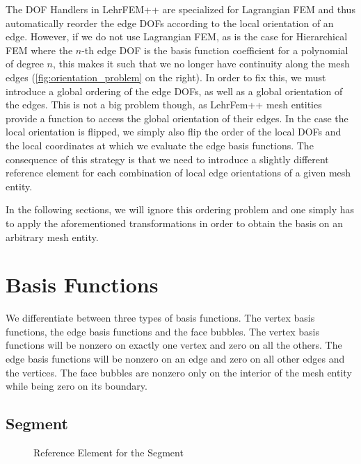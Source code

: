 \documentclass[10pt,a4paper]{article}
\begin{document}
    The DOF Handlers in LehrFEM++ are specialized for Lagrangian FEM and thus automatically reorder the edge DOFs according to the local orientation of an edge. However, if we do not use Lagrangian FEM, as is the case for Hierarchical FEM where the $n$-th edge DOF is the basis function coefficient for a polynomial of degree $n$, this makes it such that we no longer have continuity along the mesh edges (\autoref{fig:orientation_problem} on the right). In order to fix this, we must introduce a global ordering of the edge DOFs, as well as a global orientation of the edges. This is not a big problem though, as LehrFem++ mesh entities provide a function to access the global orientation of their edges. In the case the local orientation is flipped, we simply also flip the order of the local DOFs and the local coordinates at which we evaluate the edge basis functions. The consequence of this strategy is that we need to introduce a slightly different reference element for each combination of local edge orientations of a given mesh entity.
    
    In the following sections, we will ignore this ordering problem and one simply has to apply the aforementioned transformations in order to obtain the basis on an arbitrary mesh entity.


\section{Basis Functions}

    We differentiate between three types of basis functions. The vertex basis functions, the edge basis functions and the face bubbles. The vertex basis functions will be nonzero on exactly one vertex and zero on all the others. The edge basis functions will be nonzero on an edge and zero on all other edges and the vertices. The face bubbles are nonzero only on the interior of the mesh entity while being zero on its boundary.


\subsection{Segment}

    \begin{figure}[ht!]
        \center
        \caption{Reference Element for the Segment}
        \label{fig:ref_segment}
    \end{figure}
    
\end{document}
